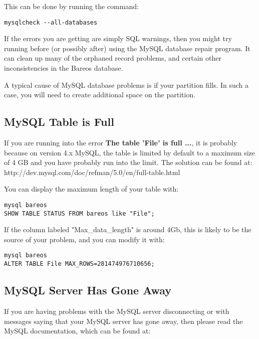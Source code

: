 This can be done by running the  command:
\footnotesize
\begin{verbatim}
mysqlcheck --all-databases
\end{verbatim}
\normalsize

If the errors you are getting are simply SQL warnings, then you might try
running  before (or possibly after) using the MySQL database repair
program. It can clean up many of the orphaned record problems, and certain
other inconsistencies in the Bareos database.

A typical cause of MySQL database problems is if your partition fills. In
such a case, you will need to create additional space on the partition.



\subsection{MySQL Table is Full}

If you are running into the error {\bf The table 'File' is full ...},
it is probably because on version 4.x MySQL, the table is limited by
default to a maximum size of 4 GB and you have probably run into
the limit. The solution can be found at:
{http://dev.mysql.com/doc/refman/5.0/en/full-table.html}

You can display the maximum length of your table with:

\footnotesize
\begin{verbatim}
mysql bareos
SHOW TABLE STATUS FROM bareos like "File";
\end{verbatim}
\normalsize

If the column labeled "Max\_data\_length" is around 4Gb, this is likely
to be the source of your problem, and you can modify it with:

\footnotesize
\begin{verbatim}
mysql bareos
ALTER TABLE File MAX_ROWS=281474976710656;
\end{verbatim}
\normalsize


\subsection{MySQL Server Has Gone Away}
If you are having problems with the MySQL server disconnecting or with
messages saying that your MySQL server has gone away, then please read
the MySQL documentation, which can be found at:

